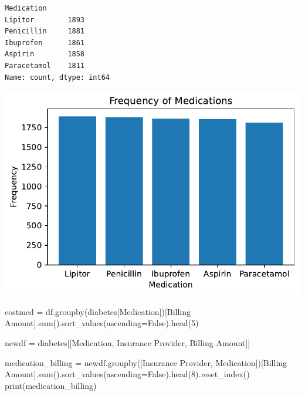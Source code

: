 \documentclass[
  letterpaper,
  DIV=11,
  numbers=noendperiod]{scrartcl}
\newenvironment{Shaded}{\begin{snugshade}}{\end{snugshade}}
\newcommand{\BuiltInTok}[1]{\textcolor[rgb]{0.00,0.23,0.31}{#1}}
\newcommand{\DecValTok}[1]{\textcolor[rgb]{0.68,0.00,0.00}{#1}}
\newcommand{\NormalTok}[1]{\textcolor[rgb]{0.00,0.23,0.31}{#1}}
\newcommand{\OperatorTok}[1]{\textcolor[rgb]{0.37,0.37,0.37}{#1}}
\newcommand{\StringTok}[1]{\textcolor[rgb]{0.13,0.47,0.30}{#1}}
\newcommand{\VariableTok}[1]{\textcolor[rgb]{0.07,0.07,0.07}{#1}}
\begin{document}
\begin{verbatim}
Medication
Lipitor        1893
Penicillin     1881
Ibuprofen      1861
Aspirin        1858
Paracetamol    1811
Name: count, dtype: int64
\end{verbatim}

\includegraphics{index_files/figure-pdf/cell-6-output-2.pdf}

\begin{Shaded}
\begin{Highlighting}[]
\NormalTok{costmed }\OperatorTok{=}\NormalTok{ df.groupby(diabetes[}\StringTok{\textquotesingle{}Medication\textquotesingle{}}\NormalTok{])[}\StringTok{\textquotesingle{}Billing Amount\textquotesingle{}}\NormalTok{].}\BuiltInTok{sum}\NormalTok{().sort\_values(ascending}\OperatorTok{=}\VariableTok{False}\NormalTok{).head(}\DecValTok{5}\NormalTok{)}


\NormalTok{newdf }\OperatorTok{=}\NormalTok{ diabetes[[}\StringTok{\textquotesingle{}Medication\textquotesingle{}}\NormalTok{, }\StringTok{\textquotesingle{}Insurance Provider\textquotesingle{}}\NormalTok{, }\StringTok{\textquotesingle{}Billing Amount\textquotesingle{}}\NormalTok{]]}

\NormalTok{medication\_billing }\OperatorTok{=}\NormalTok{ newdf.groupby([}\StringTok{\textquotesingle{}Insurance Provider\textquotesingle{}}\NormalTok{, }\StringTok{\textquotesingle{}Medication\textquotesingle{}}\NormalTok{])[}\StringTok{\textquotesingle{}Billing Amount\textquotesingle{}}\NormalTok{].}\BuiltInTok{sum}\NormalTok{().sort\_values(ascending}\OperatorTok{=}\VariableTok{False}\NormalTok{).head(}\DecValTok{8}\NormalTok{).reset\_index()}
\BuiltInTok{print}\NormalTok{(medication\_billing)}
\end{Highlighting}
\end{Shaded}
\end{document}
